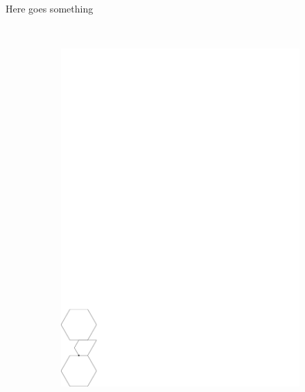 Here goes something
\begin{figure}[h]
\begin{center}
  ~ %
  \begin{subfigure}[b]{0.45\textwidth}
	  \includegraphics[width=\textwidth]{graphics/RightSwitchBetweenTwoPolygons.pdf}

\end{subfigure}
\end{center}
\end{figure}
